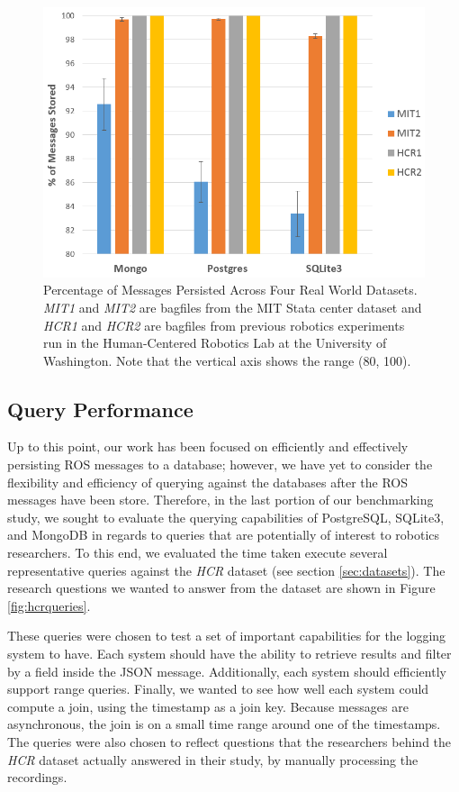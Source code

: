 \documentclass[nocopyrightspace]{acm_proc_article-sp}
\begin{document}
\begin{figure}
    \centering
    \includegraphics[width=\linewidth]{images/realworld}
    \caption{Percentage of Messages Persisted Across Four Real World Datasets. \textit{MIT1} and \textit{MIT2} are bagfiles from the MIT Stata center dataset and \textit{HCR1} and \textit{HCR2} are bagfiles from previous robotics experiments run in the Human-Centered Robotics Lab at the University of Washington. Note that the vertical axis shows the range (80, 100).}
    \label{fig:realworld}
\end{figure}

\subsection{Query Performance}
Up to this point, our work has been focused on efficiently and effectively persisting ROS messages to a database; however, we have yet to consider the flexibility and efficiency of querying against the databases after the ROS messages have been store. Therefore, in the last portion of our benchmarking study, we sought to evaluate the querying capabilities of PostgreSQL, SQLite3, and MongoDB in regards to queries that are potentially of interest to robotics researchers. To this end, we evaluated the time taken execute several representative queries against the \textit{HCR} dataset (see section \ref{sec:datasets}). The research questions we wanted to answer from the dataset are shown in Figure \ref{fig:hcrqueries}.

These queries were chosen to test a set of important capabilities for the logging system to have. Each system should have the ability to retrieve results and filter by a field inside the JSON message. Additionally, each system should efficiently support range queries. Finally, we wanted to see how well each system could compute a join, using the timestamp as a join key. Because messages are asynchronous, the join is on a small time range around one of the timestamps. The queries were also chosen to reflect questions that the researchers behind the \textit{HCR} dataset actually answered in their study, by manually processing the recordings.
\end{document}
